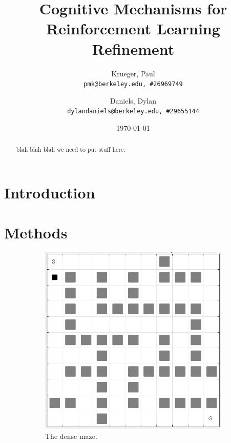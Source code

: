 \documentclass[notitlepage]{article}
\title{Cognitive Mechanisms for Reinforcement Learning Refinement}
\author{
  Krueger, Paul\\
  \texttt{pmk@berkeley.edu,\ \#26969749}
  \and
  Daniels, Dylan\\
  \texttt{dylandaniels@berkeley.edu,\ \#29655144}
}
\date{\today}
\begin{document}
\maketitle

\begin{abstract}
blah blah blah we need to put stuff here.
\end{abstract}

\section*{Introduction}

\section*{Methods}

\begin{figure}
\centering
\begin{subfigure}{.4\textwidth}
  \centering
  \includegraphics[width=.95\linewidth]{dense_maze}
  \caption{The dense maze.}
\end{subfigure}
\begin{subfigure}{.4\textwidth}
  \centering

\end{subfigure}
\end{figure}
\end{document}
